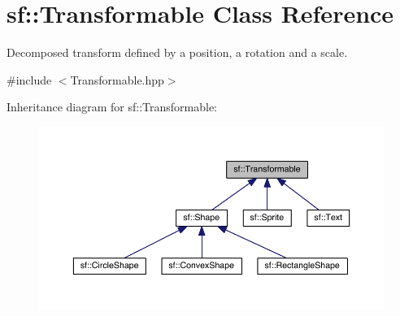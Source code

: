 \hypertarget{classsf_1_1_transformable}{\section{sf\-:\-:Transformable Class Reference}
\label{classsf_1_1_transformable}
}


Decomposed transform defined by a position, a rotation and a scale.  




{\ttfamily \#include $<$Transformable.\-hpp$>$}



Inheritance diagram for sf\-:\-:Transformable\-:
\nopagebreak
\begin{figure}[H]
\begin{center}
\leavevmode
\includegraphics[width=350pt]{classsf_1_1_transformable__inherit__graph}
\end{center}
\end{figure}
